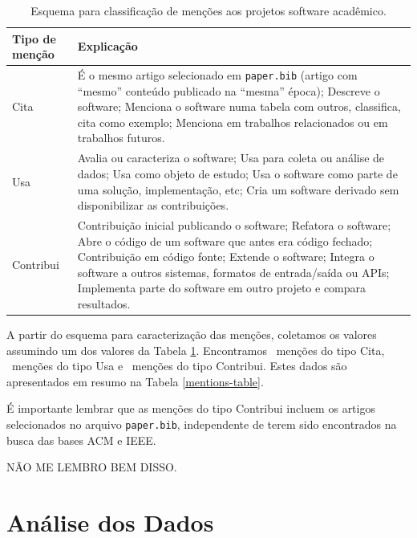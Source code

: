 \begin{table}[h]
\caption{Esquema para classificação de menções aos projetos software acadêmico.}
\centering
\begin{tabular}{ l p{10cm} }
  \hline
  Tipo de menção           & Explicação \\
  \hline
  Cita      & É o mesmo artigo selecionado em \texttt{paper.bib} (artigo com ``mesmo'' conteúdo publicado na ``mesma'' época); Descreve o software; Menciona o software numa tabela com outros, classifica, cita como exemplo; Menciona em trabalhos relacionados ou em trabalhos futuros. \\
  Usa       & Avalia ou caracteriza o software; Usa para coleta ou análise de dados; Usa como objeto de estudo; Usa o software como parte de uma solução, implementação, etc; Cria um software derivado sem disponibilizar as contribuições. \\
  Contribui & Contribuição inicial publicando o software; Refatora o software; Abre o código de um software que antes era código fechado; Contribuição em código fonte; Extende o software; Integra o software a outros sistemas, formatos de entrada/saída ou APIs; Implementa parte do software em outro projeto e compara resultados. \\
  \hline
\end{tabular}
\label{esquema-de-mencao}
\end{table}


A partir do esquema para caracterização das menções, coletamos os valores
assumindo um dos valores da Tabela \ref{esquema-de-mencao}. Encontramos
\CiteCount \ menções do tipo Cita, \UseCount \ menções do tipo Usa e
\ContributeCount \ menções do tipo Contribui. Estes dados são
apresentados em resumo na Tabela \ref{mentions-table}.



É importante lembrar que as menções do tipo Contribui incluem os artigos
selecionados no arquivo \texttt{paper.bib}, independente de terem sido
encontrados na busca das bases ACM e IEEE.

NÃO ME LEMBRO BEM DISSO.



\section{Análise dos Dados} \label{estudo2:analise} %


